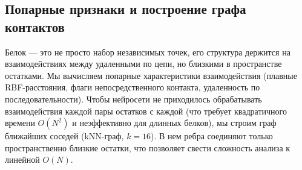 \documentclass[12pt, a4paper]{article}
\begin{document}
\subsection{Попарные признаки и построение графа контактов}
Белок — это не просто набор независимых точек, его структура держится на взаимодействиях между удаленными по цепи, но близкими в пространстве остатками. Мы вычисляем попарные характеристики взаимодействия (плавные RBF-расстояния, флаги непосредственного контакта, удаленность по последовательности). Чтобы нейросети не приходилось обрабатывать взаимодействия каждой пары остатков с каждой (что требует квадратичного времени $O(N^2)$ и неэффективно для длинных белков), мы строим граф ближайших соседей (kNN-граф, $k=16$). В нем ребра соединяют только пространственно близкие остатки, что позволяет свести сложность анализа к линейной $O(N)$.
\end{document}
